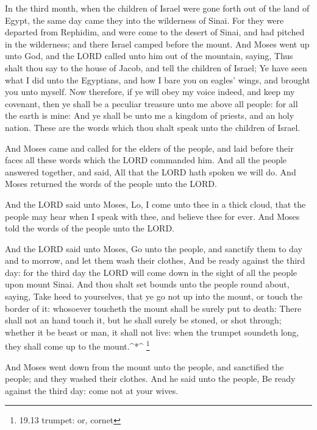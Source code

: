  In the third month, when the children of Israel were gone
forth out of the land of Egypt, the same day came they into the
wilderness of Sinai.  For they were departed from Rephidim,
and were come to the desert of Sinai, and had pitched in the wilderness;
and there Israel camped before the mount.  And Moses went up
unto God, and the LORD called unto him out of the mountain, saying, Thus
shalt thou say to the house of Jacob, and tell the children of Israel;
 Ye have seen what I did unto the Egyptians, and how I bare
you on eagles' wings, and brought you unto myself.  Now
therefore, if ye will obey my voice indeed, and keep my covenant, then
ye shall be a peculiar treasure unto me above all people: for all the
earth is mine:  And ye shall be unto me a kingdom of
priests, and an holy nation. These are the words which thou shalt speak
unto the children of Israel.

 And Moses came and called for the elders of the people, and
laid before their faces all these words which the LORD commanded him.
 And all the people answered together, and said, All that
the LORD hath spoken we will do. And Moses returned the words of the
people unto the LORD.

 And the LORD said unto Moses, Lo, I come unto thee in a
thick cloud, that the people may hear when I speak with thee, and
believe thee for ever. And Moses told the words of the people unto the
LORD.

 And the LORD said unto Moses, Go unto the people, and
sanctify them to day and to morrow, and let them wash their clothes,
 And be ready against the third day: for the third day the
LORD will come down in the sight of all the people upon mount Sinai.
 And thou shalt set bounds unto the people round about,
saying, Take heed to yourselves, that ye go not up into the mount, or
touch the border of it: whosoever toucheth the mount shall be surely put
to death:  There shall not an hand touch it, but he shall
surely be stoned, or shot through; whether it be beast or man, it shall
not live: when the trumpet soundeth long, they shall come up to the
mount.\^{}*\^{} \footnote{19.13 trumpet: or, cornet}

 And Moses went down from the mount unto the people, and
sanctified the people; and they washed their clothes.  And
he said unto the people, Be ready against the third day: come not at
your wives.

